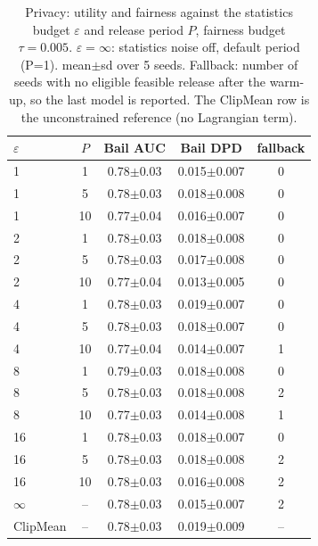 \begin{table}[t]
\centering
\footnotesize
\caption{Privacy: utility and fairness against the statistics budget $\varepsilon$ and release period $P$, fairness budget $\tau=0.005$. $\varepsilon=\infty$: statistics noise off, default period (P=1). mean$\pm$sd over 5 seeds. Fallback: number of seeds with no eligible feasible release after the warm-up, so the last model is reported. The ClipMean row is the unconstrained reference (no Lagrangian term).}
\label{tab:e5b_privacy}
\setlength{\tabcolsep}{3pt}
\begin{tabular}{lcccc}
\toprule
$\varepsilon$ & $P$ & Bail AUC & Bail DPD & fallback \\
\midrule
1 & 1 & 0.78$\pm$0.03 & 0.015$\pm$0.007 & 0 \\
1 & 5 & 0.78$\pm$0.03 & 0.018$\pm$0.008 & 0 \\
1 & 10 & 0.77$\pm$0.04 & 0.016$\pm$0.007 & 0 \\
2 & 1 & 0.78$\pm$0.03 & 0.018$\pm$0.008 & 0 \\
2 & 5 & 0.78$\pm$0.03 & 0.017$\pm$0.008 & 0 \\
2 & 10 & 0.77$\pm$0.04 & 0.013$\pm$0.005 & 0 \\
4 & 1 & 0.78$\pm$0.03 & 0.019$\pm$0.007 & 0 \\
4 & 5 & 0.78$\pm$0.03 & 0.018$\pm$0.007 & 0 \\
4 & 10 & 0.77$\pm$0.04 & 0.014$\pm$0.007 & 1 \\
8 & 1 & 0.79$\pm$0.03 & 0.018$\pm$0.008 & 0 \\
8 & 5 & 0.78$\pm$0.03 & 0.018$\pm$0.008 & 2 \\
8 & 10 & 0.77$\pm$0.03 & 0.014$\pm$0.008 & 1 \\
16 & 1 & 0.78$\pm$0.03 & 0.018$\pm$0.007 & 0 \\
16 & 5 & 0.78$\pm$0.03 & 0.018$\pm$0.008 & 2 \\
16 & 10 & 0.78$\pm$0.03 & 0.016$\pm$0.008 & 2 \\
$\infty$ & -- & 0.78$\pm$0.03 & 0.015$\pm$0.007 & 2 \\
ClipMean & -- & 0.78$\pm$0.03 & 0.019$\pm$0.009 & -- \\
\bottomrule
\end{tabular}
\end{table}
